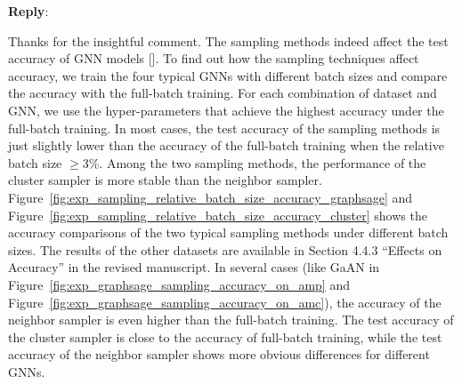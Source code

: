 \documentclass[12pt]{article}
\newenvironment{reply}
   {\medskip \noindent \textbf{Reply}:\  }
   {\medskip}
\begin{document}
\begin{reply}

    Thanks for the insightful comment.
    The sampling methods indeed affect the test accuracy of GNN models [\cite{hamilton2017_graphsage, chiang2019_cluster_gcn, zeng2020_graphsaint}].
    To find out how the sampling techniques affect accuracy, we train the four typical GNNs with different batch sizes and compare the accuracy with the full-batch training.
    For each combination of dataset and GNN, we use the hyper-parameters that achieve the highest accuracy under the full-batch training.
    In most cases, the test accuracy of the sampling methods is just slightly lower than the accuracy of the full-batch training when the relative batch size $\geq 3\%$.
    Among the two sampling methods, the performance of the cluster sampler is more stable than the neighbor sampler.
    Figure~\ref{fig:exp_sampling_relative_batch_size_accuracy_graphsage}  and Figure~\ref{fig:exp_sampling_relative_batch_size_accuracy_cluster} shows the accuracy comparisons of the two typical sampling methods under different batch sizes.
    The results of the other datasets are available in Section 4.4.3 ``Effects on Accuracy'' in the revised manuscript.
    In several cases (like GaAN in Figure~\ref{fig:exp_graphsage_sampling_accuracy_on_amp} and Figure~\ref{fig:exp_graphsage_sampling_accuracy_on_amc}), the accuracy of the neighbor sampler is even higher than the full-batch training.
    The test accuracy of the cluster sampler is close to the accuracy of full-batch training, while the test accuracy of the neighbor sampler shows more obvious differences for different GNNs.
        


\end{reply}
\end{document}
